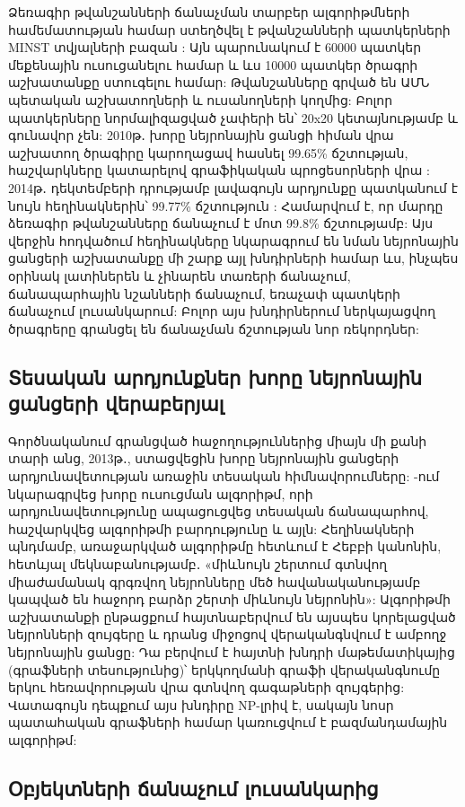 \documentclass[12pt,final]{amsproc}
\begin{document}
Ձեռագիր թվանշանների ճանաչման տարբեր ալգորիթմների համեմատության համար ստեղծվել է թվանշանների պատկերների MINST տվյալների բազան \cite{MNIST}: Այն պարունակում է 60000 պատկեր մեքենային ուսուցանելու համար և ևս 10000 պատկեր ծրագրի աշխատանքը ստուգելու համար: Թվանշանները գրված են ԱՄՆ պետական աշխատողների և ուսանողների կողմից: Բոլոր պատկերները նորմալիզացված չափերի են՝ 20x20 կետայնությամբ և գունավոր չեն: 2010թ․ խորը նեյրոնային ցանցի հիման վրա աշխատող ծրագիրը կարողացավ հասնել 99.65\% ճշտության, հաշվարկները կատարելով  գրաֆիկական պրոցեսորների վրա \cite{MNIST035}: 2014թ․ դեկտեմբերի դրությամբ լավագույն արդյունքը պատկանում է նույն հեղինակներին՝ 99.77\% ճշտություն \cite{MNIST023}: Համարվում է, որ մարդը ձեռագիր թվանշանները ճանաչում է մոտ 99.8\% ճշտությամբ: Այս վերջին հոդվածում հեղինակները նկարագրում են նման նեյրոնային ցանցերի աշխատանքը մի շարք այլ խնդիրների համար ևս, ինչպես օրինակ լատիներեն և չինարեն տառերի ճանաչում, ճանապարհային նշանների ճանաչում, եռաչափ պատկերի ճանաչում լուսանկարում: Բոլոր այս խնդիրներում ներկայացվող ծրագրերը գրանցել են ճանաչման ճշտության նոր ռեկորդներ:

\subsection{Տեսական արդյունքներ խորը նեյրոնային ցանցերի վերաբերյալ}

Գործնականում գրանցված հաջողություններից միայն մի քանի տարի անց, 2013թ․, ստացվեցին խորը նեյրոնային ցանցերի արդյունավետության առաջին տեսական հիմնավորումները: \cite{Arora2013}-ում նկարագրվեց խորը ուսուցման ալգորիթմ, որի արդյունավետությունը ապացուցվեց տեսական ճանապարհով, հաշվարկվեց ալգորիթմի բարդությունը և այլն: Հեղինակների պնդմամբ, առաջարկված ալգորիթմը հետևում է Հեբբի կանոնին, հետևյալ մեկնաբանությամբ․ «միևնույն շերտում գտնվող միաժամանակ գրգռվող նեյրոնները մեծ հավանականությամբ կապված են հաջորդ բարձր շերտի միևնույն նեյրոնին»: Ալգորիթմի աշխատանքի ընթացքում հայտնաբերվում են այսպես կորելացված նեյրոնների զույգերը և դրանց միջոցով վերականգնվում է ամբողջ նեյրոնային ցանցը: Դա բերվում է հայտնի խնդրի մաթեմատիկայից (գրաֆների տեսությունից)՝ երկկողմանի գրաֆի վերականգնումը երկու հեռավորության վրա գտնվող գագաթների զույգերից: Վատագույն դեպքում այս խնդիրը NP-լրիվ է, սակայն նոսր պատահական գրաֆների համար կառուցվում է բազմանդամային ալգորիթմ: 

\subsection{Օբյեկտների ճանաչում լուսանկարից}
\end{document}
